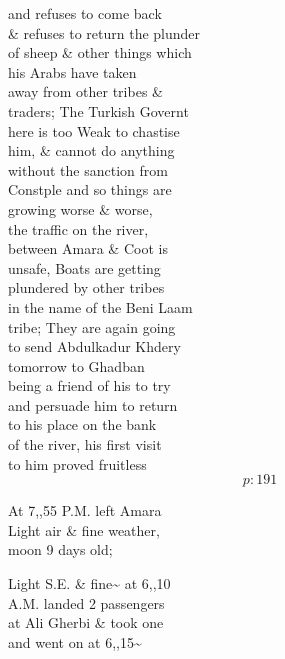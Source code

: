 \documentclass{report}
\begin{document}
	\par{
 	and refuses to come back\ \\\& refuses to return the plunder\ \\of sheep \& other things which\ \\his Arabs have taken\ \\away from other tribes \&\ \\traders; The Turkish Governt\ \\here is too Weak to chastise\ \\him, \& cannot do anything\ \\without the sanction from\ \\Constple and so things are\ \\growing worse \& worse,\ \\the traffic on the river,\ \\between Amara \& Coot is\ \\unsafe, Boats are getting\ \\plundered by other tribes\ \\in the name of the Beni Laam\ \\tribe; They are again going\ \\to send Abdulkadur Khdery\ \\tomorrow to Ghadban\ \\being a friend of his to try\ \\and persuade him to return\ \\to his place on the bank\ \\of the river, his first visit\ \\to him proved fruitless\ \\
  \[p: 191 \]

	}



	\par{
 	At 7,,55 P.M. left Amara\ \\Light air \& fine weather,\ \\moon 9 days old;\ \\
	}

	\par{
 	Light S.E. \& fine\~{} at 6,,10\ \\A.M. landed 2 passengers\ \\at Ali Gherbi \& took one\ \\and went on at 6,,15\~{}\ \\
	}
\end{document}
